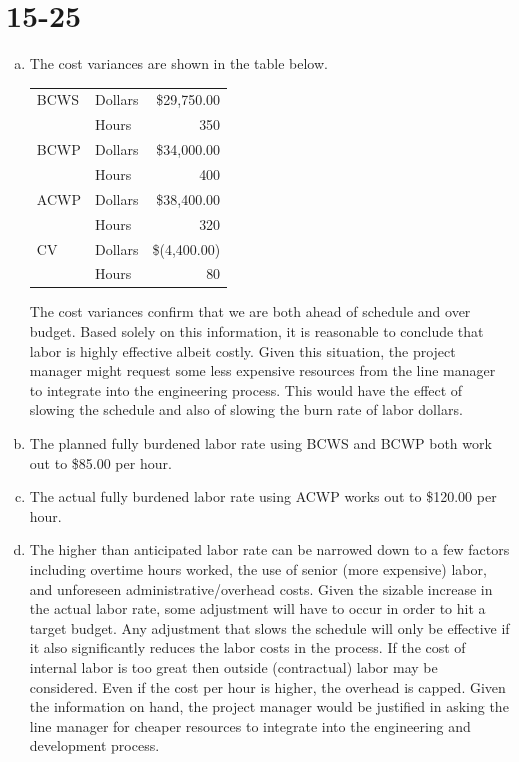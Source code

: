 \documentclass[letterpaper,10pt]{article}
\begin{document}
\section*{15-25}
\begin{enumerate}[a.]
\item The cost variances are shown in the table below.
\begin{center}
  \begin{tabular}{llr}
  	\hline
    	BCWS	& Dollars	 & \$29,750.00 \\
		& Hours	& 350 \\
	BCWP	& Dollars	 & \$34,000.00 \\
		& Hours	& 400 \\
	ACWP	& Dollars	 & \$38,400.00 \\
		& Hours	& 320 \\
	CV	& Dollars	 & \$(4,400.00) \\
		& Hours	& 80 \\
    \hline
  \end{tabular}
\end{center}
The cost variances confirm that we are both ahead of schedule and over budget.  Based solely on this information, it is reasonable to conclude that labor is highly effective albeit costly.  Given this situation, the project manager might request some less expensive resources from the line manager to integrate into the engineering process.  This would have the effect of slowing the schedule and also of slowing the burn rate of labor dollars.
\item The planned fully burdened labor rate using BCWS and BCWP both work out to \$85.00 per hour.
\item The actual fully burdened labor rate using ACWP works out to \$120.00 per hour.
\item The higher than anticipated labor rate can be narrowed down to a few factors including overtime hours worked, the use of senior (more expensive) labor, and unforeseen administrative/overhead costs.  Given the sizable increase in the actual labor rate, some adjustment will have to occur in order to hit a target budget.  Any adjustment that slows the schedule will only be effective if it also significantly reduces the labor costs in the process.  If the cost of internal labor is too great then outside (contractual) labor may be considered.  Even if the cost per hour is higher, the overhead is capped.  Given the information on hand, the project manager would be justified in asking the line manager for cheaper resources to integrate into the engineering and development process.

\end{enumerate}
\end{document}
